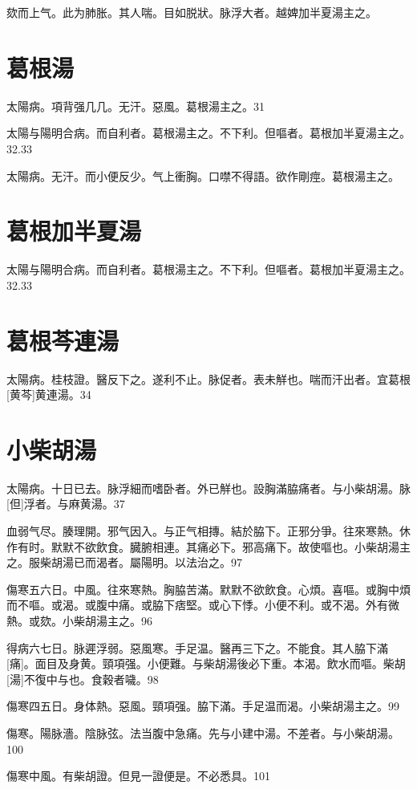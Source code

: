 \documentclass[12pt,twoside,UTF8,b5paper]{ctexbook}
\begin{document}
欬而上气。此为肺胀。其人喘。目如脱狀。脉浮大者。越婢加半夏湯主之。

\section{葛根湯}

太陽病。項背强几几。无汗。惡風。葛根湯主之。31

太陽与陽明合病。而自利者。葛根湯主之。不下利。但嘔者。葛根加半夏湯主之。32.33

太陽病。无汗。而小便反少。气上衝胸。口噤不得語。欲作剛痙。葛根湯主之。

\section{葛根加半夏湯}

太陽与陽明合病。而自利者。葛根湯主之。不下利。但嘔者。葛根加半夏湯主之。32.33

\section{葛根芩連湯}

太陽病。桂枝證。醫反下之。遂利不止。脉促者。表未觧也。喘而汗出者。宜葛根[黄芩]黄連湯。34

\section{小柴胡湯}

太陽病。十日已去。脉浮細而嗜卧者。外已觧也。設胸滿脇痛者。与小柴胡湯。脉[但]浮者。与麻黄湯。37

血弱气尽。腠理開。邪气因入。与正气相摶。結於脇下。正邪分爭。往來寒熱。休作有时。默默不欲飲食。臓腑相連。其痛必下。邪高痛下。故使嘔也。小柴胡湯主之。服柴胡湯已而渴者。屬陽明。以法治之。97

傷寒五六日。中風。往來寒熱。胸脇苦滿。默默不欲飲食。心煩。喜嘔。或胸中煩而不嘔。或渴。或腹中痛。或脇下痞堅。或心下悸。小便不利。或不渴。外有微熱。或欬。小柴胡湯主之。96

得病六七日。脉遲浮弱。惡風寒。手足温。醫再三下之。不能食。其人脇下滿[痛]。面目及身黄。頸項强。小便難。与柴胡湯後必下重。本渴。飲水而嘔。柴胡[湯]不復中与也。食穀者噦。98

傷寒四五日。身体熱。惡風。頸項强。脇下滿。手足温而渴。小柴胡湯主之。99

傷寒。陽脉濇。陰脉弦。法当腹中急痛。先与小建中湯。不差者。与小柴胡湯。100

傷寒中風。有柴胡證。但見一證便是。不必悉具。101
\end{document}
